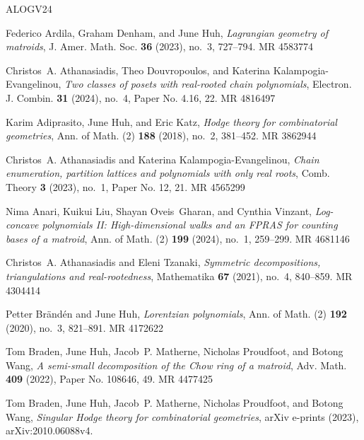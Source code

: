 \documentclass[11pt]{amsart}
\theoremstyle{theorems}
\theoremstyle{definition}
\begin{document}
\newcommand{\etalchar}[1]{$^{#1}$}
\providecommand{\bysame}{\leavevmode\hbox to3em{\hrulefill}\thinspace}
\providecommand{\MR}{\relax\ifhmode\unskip\space\fi MR }
\providecommand{\MRhref}[2]{%
  \href{http://www.ams.org/mathscinet-getitem?mr=#1}{#2}
}
\providecommand{\href}[2]{#2}
\begin{thebibliography}{ALOGV24}

Federico Ardila, Graham Denham, and June Huh, \emph{Lagrangian geometry of matroids}, J. Amer. Math. Soc. \textbf{36} (2023), no.~3, 727--794. \MR{4583774}

Christos~A. {Athanasiadis}, Theo {Douvropoulos}, and Katerina {Kalampogia-Evangelinou}, \emph{{Two classes of posets with real-rooted chain polynomials}}, Electron. J. Combin. \textbf{31} (2024), no.~4, Paper No. 4.16, 22. \MR{4816497}

Karim Adiprasito, June Huh, and Eric Katz, \emph{Hodge theory for combinatorial geometries}, Ann. of Math. (2) \textbf{188} (2018), no.~2, 381--452. \MR{3862944}

Christos~A. Athanasiadis and Katerina Kalampogia-Evangelinou, \emph{Chain enumeration, partition lattices and polynomials with only real roots}, Comb. Theory \textbf{3} (2023), no.~1, Paper No. 12, 21. \MR{4565299}

Nima Anari, Kuikui Liu, Shayan Oveis~Gharan, and Cynthia Vinzant, \emph{Log-concave polynomials {II}: {H}igh-dimensional walks and an {FPRAS} for counting bases of a matroid}, Ann. of Math. (2) \textbf{199} (2024), no.~1, 259--299. \MR{4681146}

Christos~A. Athanasiadis and Eleni Tzanaki, \emph{Symmetric decompositions, triangulations and real-rootedness}, Mathematika \textbf{67} (2021), no.~4, 840--859. \MR{4304414}

Petter Br\"and\'en and June Huh, \emph{Lorentzian polynomials}, Ann. of Math. (2) \textbf{192} (2020), no.~3, 821--891. \MR{4172622}

\bibitem[BHM{\etalchar{+}}22]{BHMPW1}
Tom Braden, June Huh, Jacob~P. Matherne, Nicholas Proudfoot, and Botong Wang, \emph{A semi-small decomposition of the {C}how ring of a matroid}, Adv. Math. \textbf{409} (2022), Paper No. 108646, 49. \MR{4477425}

\bibitem[BHM{\etalchar{+}}23]{BHMPW2}
Tom {Braden}, June {Huh}, Jacob~P. {Matherne}, Nicholas {Proudfoot}, and Botong {Wang}, \emph{{Singular Hodge theory for combinatorial geometries}}, arXiv e-prints (2023), arXiv:2010.06088v4.


\end{thebibliography}
\end{document}
